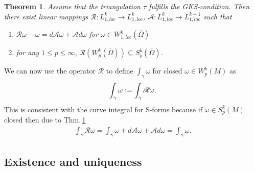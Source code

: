 \documentclass[12pt,a4paper]{article}
\newtheorem{theorem}{Theorem}
\theoremstyle{definition}
\newcommand{\omegabar}{\overline{\Omega}}
\newcommand{\rop}{\mathscr{R}} %
\begin{document}
\begin{theorem}\label{operators}
    Assume that the triangulation $\tau$ fulfills the GKS-condition.
    Then there exist linear mappings $\mathscr{R}: L^k_{1,loc} \rightarrow 
    L^k_{1,loc}$, $\mathscr{A}: L^k_{1,loc} \rightarrow L^{k-1}_{1,loc}$ 
    such that
    \begin{enumerate}
        \item $\mathscr{R}\omega - \omega = 
            d\mathscr{A}\omega + \mathscr{A}d\omega$ for 
            $\omega \in W^k_{1,loc}(\omegabar)$
        \item for any $1 \leq p \leq \infty$, 
            $\rop(W^k_p(\omegabar)) \subseteq S^k_p(\omegabar)$.
    \end{enumerate}
\end{theorem}

\noindent We can now use the operator $\rop$ to define $\int_\gamma \omega$ for closed
$\omega \in W^k_p(M)$ as
\begin{align*}
\int_\gamma \omega \vcentcolon= \int_\gamma \rop\omega.
\end{align*}
This is consistent with the curve integral for S-forms 
because if $\omega \in S^k_p(M)$ closed then due to 
Thm.\,\ref{operators}
\begin{align*}
\int_\gamma \rop\omega = 
\int_\gamma \omega + d\mathscr{A}\omega + \mathscr{A}d\omega = 
\int_\gamma \omega.
\end{align*}










\subsection{Existence and uniqueness}
\end{document}
